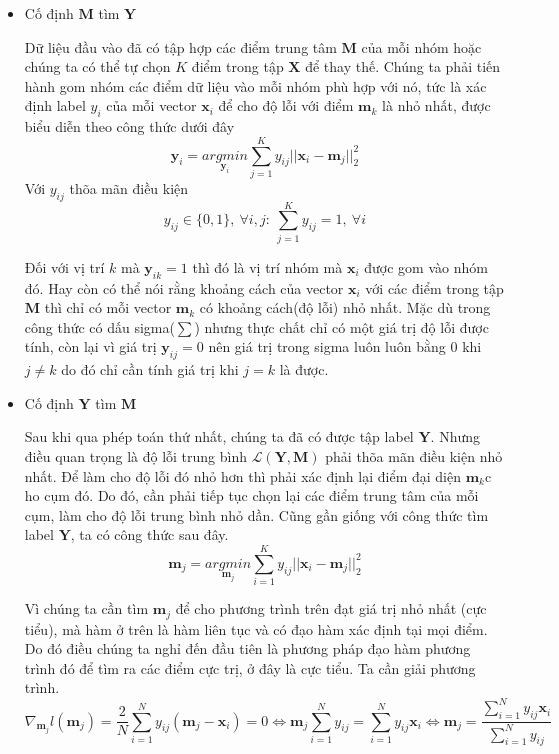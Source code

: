 \documentclass{article}
\begin{document}
	\begin{itemize}
		\item Cố định $\mathbf{M}$ tìm $\mathbf{Y}$

		Dữ liệu đầu vào đã có tập hợp các điểm trung tâm $\mathbf{M}$ của mỗi nhóm hoặc chúng ta có thể tự chọn $K$ điểm trong tập $\mathbf{X}$ để thay thế. Chúng ta phải tiến hành gom nhóm các điểm dữ liệu vào mỗi nhóm phù hợp với nó, tức là xác định label $y_{i}$ của mỗi vector $\mathbf{x}_i$ để cho độ lỗi với điểm $\mathbf{m}_k$ là nhỏ nhất, được biểu diễn theo công thức dưới đây
			\[
			\mathbf{y}_i = \underset{\mathbf{y}_i}{argmin}\sum_{j = 1}^{K}y_{ij}||\mathbf{x}_i-\mathbf{m}_j||^2_2
			\]
	Với $y_{ij}$ thõa mãn điều kiện
	\[
	y_{ij} \in \{0,1\},\ \forall i,j:\ \sum_{j = 1}^{K} y_{ij}= 1,\  \forall i
	\]

		Đối với vị trí $k$ mà $\mathbf{y}_{ik} = 1$ thì đó là vị trí nhóm mà $\mathbf{x}_i$ được gom vào nhóm đó. Hay còn có thể nói rằng khoảng cách của vector $\mathbf{x}_i$ với các điểm trong tập $\mathbf{M}$ thì chỉ có mỗi vector $\mathbf{m}_k$ có khoảng cách(độ lỗi) nhỏ nhất. Mặc dù trong công thức có dấu sigma($\sum$) nhưng thực chất chỉ có một giá trị độ lỗi được tính, còn lại vì giá trị $\mathbf{y}_{ij} = 0$ nên giá trị trong sigma luôn luôn bằng 0 khi $j\neq k$ do đó chỉ cần tính giá trị khi $j = k$ là được.
		\item Cố định $\mathbf{Y}$ tìm $\mathbf{M}$

		Sau khi qua phép toán thứ nhất, chúng ta đã có được tập label $\mathbf{Y}$. Nhưng điều quan trọng là độ lỗi trung bình $\mathcal{L}(\mathbf{Y},\mathbf{M})$ phải thõa mãn điều kiện nhỏ nhất. Để làm cho độ lỗi đó nhỏ hơn thì phải xác định lại điểm đại diện $\mathbf{m}_k$c ho cụm đó. Do đó, cần phải tiếp tục chọn lại các điểm trung tâm của mỗi cụm, làm cho độ lỗi trung bình nhỏ dần. Cũng gần giống với công thức tìm label $\mathbf{Y}$, ta có công thức sau đây.
		\[
			\mathbf{m}_j = \underset{\mathbf{m}_j}{argmin}\sum_{i = 1}^{K}y_{ij}||\mathbf{x}_i-\mathbf{m}_j||^2_2
			\]

		Vì chúng ta cần tìm $\mathbf{m}_j$ để cho phương trình trên đạt giá trị nhỏ nhất (cực tiểu), mà hàm ở trên là hàm liên tục và có đạo hàm xác định tại mọi điểm. Do đó điều chúng ta nghỉ đến đầu tiên là phương pháp đạo hàm phương trình đó để tìm ra các điểm cực trị, ở đây là cực tiểu. Ta cần giải phương trình.
		$$
		\nabla_{\mathbf{m}_j}l({\mathbf{m}_j}) = \frac{2}{N}\sum_{i = 1}^{N}y_{ij}(\mathbf{m}_j-\mathbf{x}_i) = 0 \Leftrightarrow \mathbf{m}_j\sum_{i = 1}^{N}y_{ij} = \sum_{i = 1}^Ny_{ij}\mathbf{x}_i \Leftrightarrow \mathbf{m}_j = \frac{\sum_{i = 1}^{N}y_{ij}\mathbf{x}_i}{\sum_{i = 1}^{N}y_{ij}}
		$$


\end{itemize}
\end{document}
